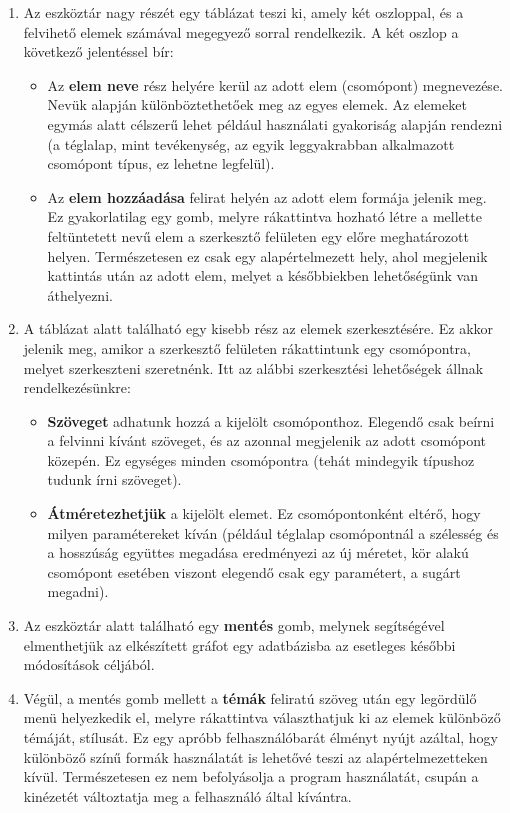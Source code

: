 \begin{enumerate}
\item Az eszköztár nagy részét egy táblázat teszi ki, amely két oszloppal, és a felvihető elemek számával megegyező sorral rendelkezik. A két oszlop a következő jelentéssel bír:

\begin{itemize}
\item Az \textbf{elem neve} rész helyére kerül az adott elem (csomópont) megnevezése. Nevük alapján különböztethetőek meg az egyes elemek. Az elemeket egymás alatt célszerű lehet például használati gyakoriság alapján rendezni (a téglalap, mint tevékenység, az egyik leggyakrabban alkalmazott csomópont típus, ez lehetne legfelül).
\item Az \textbf{elem hozzáadása} felirat helyén az adott elem formája jelenik meg. Ez gyakorlatilag egy gomb, melyre rákattintva hozható létre a mellette feltüntetett nevű elem a szerkesztő felületen egy előre meghatározott helyen. Természetesen ez csak egy alapértelmezett hely, ahol megjelenik kattintás után az adott elem, melyet a későbbiekben lehetőségünk van áthelyezni.
\end{itemize}

\item A táblázat alatt található egy kisebb rész az elemek szerkesztésére. Ez akkor jelenik meg, amikor a szerkesztő felületen rákattintunk egy csomópontra, melyet szerkeszteni szeretnénk. Itt az alábbi szerkesztési lehetőségek állnak rendelkezésünkre:

\begin{itemize}
\item \textbf{Szöveget} adhatunk hozzá a kijelölt csomóponthoz. Elegendő csak beírni a felvinni kívánt szöveget, és az azonnal megjelenik az adott csomópont közepén. Ez egységes minden csomópontra (tehát mindegyik típushoz tudunk írni szöveget).
\item \textbf{Átméretezhetjük} a kijelölt elemet. Ez csomópontonként eltérő, hogy milyen paramétereket kíván (például téglalap csomópontnál a szélesség és a hosszúság együttes megadása eredményezi az új méretet, kör alakú csomópont esetében viszont elegendő csak egy paramétert, a sugárt megadni).
\end{itemize}

\item Az eszköztár alatt található egy \textbf{mentés} gomb, melynek segítségével elmenthetjük az elkészített gráfot egy adatbázisba az esetleges későbbi módosítások céljából.

\item Végül, a mentés gomb mellett a \textbf{témák} feliratú szöveg után egy legördülő menü helyezkedik el, melyre rákattintva választhatjuk ki az elemek különböző témáját, stílusát. Ez egy apróbb felhasználóbarát élményt nyújt azáltal, hogy különböző színű formák használatát is lehetővé teszi az alapértelmezetteken kívül. Természetesen ez nem befolyásolja a program használatát, csupán a kinézetét változtatja meg a felhasználó által kívántra.
\end{enumerate}

